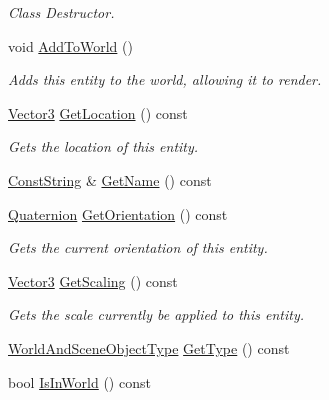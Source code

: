 \begin{DoxyCompactItemize}
\begin{DoxyCompactList}\small\item\em Class Destructor. \item\end{DoxyCompactList}\item 
void \hyperlink{classMezzanine_1_1Entity_add48bc9fd02f427e271392597b9dad9f}{AddToWorld} ()
\begin{DoxyCompactList}\small\item\em Adds this entity to the world, allowing it to render. \item\end{DoxyCompactList}\item 
\hyperlink{classMezzanine_1_1Vector3}{Vector3} \hyperlink{classMezzanine_1_1Entity_abef3e9fd62085c0ebc0bcab8199f7ce7}{GetLocation} () const 
\begin{DoxyCompactList}\small\item\em Gets the location of this entity. \item\end{DoxyCompactList}\item 
\hyperlink{namespaceMezzanine_a63cd699ac54b73953f35ec9cfc05e506}{ConstString} \& \hyperlink{classMezzanine_1_1Entity_aa1bf505993225def530582741e4e58c4}{GetName} () const 
\item 
\hyperlink{classMezzanine_1_1Quaternion}{Quaternion} \hyperlink{classMezzanine_1_1Entity_a3ffd4d4d16a5c3579201491af3363fc9}{GetOrientation} () const 
\begin{DoxyCompactList}\small\item\em Gets the current orientation of this entity. \item\end{DoxyCompactList}\item 
\hyperlink{classMezzanine_1_1Vector3}{Vector3} \hyperlink{classMezzanine_1_1Entity_adbe312d008e7395947c6a4565068ed90}{GetScaling} () const 
\begin{DoxyCompactList}\small\item\em Gets the scale currently be applied to this entity. \item\end{DoxyCompactList}\item 
\hyperlink{namespaceMezzanine_ae8cd04f706f4998be62f454b7119c718}{WorldAndSceneObjectType} \hyperlink{classMezzanine_1_1Entity_a176fea54a32a2e91027e12cecab4bb60}{GetType} () const 
\item 
bool \hyperlink{classMezzanine_1_1Entity_a150d2efaeff73bea1fe19735d81cfa30}{IsInWorld} () const 

\end{DoxyCompactItemize}
